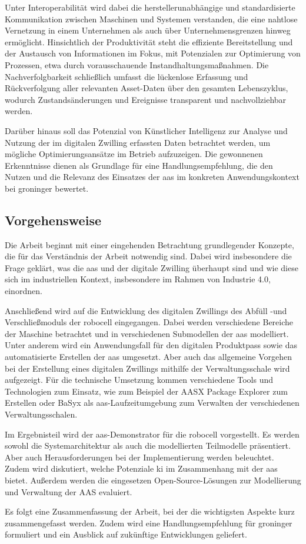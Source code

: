 Unter Interoperabilität wird dabei die herstellerunabhängige und standardisierte Kommunikation zwischen Maschinen und Systemen verstanden, die eine nahtlose Vernetzung in einem Unternehmen als auch über Unternehmensgrenzen hinweg ermöglicht.
Hinsichtlich der Produktivität steht die effiziente Bereitstellung und der Austausch von Informationen im Fokus, mit Potenzialen zur Optimierung von Prozessen, etwa durch vorausschauende Instandhaltungsmaßnahmen. 
Die Nachverfolgbarkeit schließlich umfasst die lückenlose Erfassung und Rückverfolgung aller relevanten Asset-Daten über den gesamten Lebenszyklus, wodurch Zustandsänderungen und Ereignisse transparent und nachvollziehbar werden.

Darüber hinaus soll das Potenzial von Künstlicher Intelligenz zur Analyse und Nutzung der im digitalen Zwilling erfassten Daten betrachtet werden, um mögliche Optimierungsansätze im Betrieb aufzuzeigen.
Die gewonnenen Erkenntnisse dienen als Grundlage für eine Handlungsempfehlung, die den Nutzen und die Relevanz des Einsatzes der \acs{aas} im konkreten Anwendungskontext bei groninger bewertet.

\subsection{Vorgehensweise}
Die Arbeit beginnt mit einer eingehenden Betrachtung grundlegender Konzepte, die für das Verständnis der Arbeit notwendig sind. 
Dabei wird insbesondere die Frage geklärt, was die \acs{aas} und der digitale Zwilling überhaupt sind und wie diese sich im industriellen Kontext, insbesondere im Rahmen von Industrie 4.0, einordnen.

Anschließend wird auf die Entwicklung des digitalen Zwillings des Abfüll -und Verschließmoduls der robocell eingegangen. 
Dabei werden verschiedene Bereiche der Maschine betrachtet und in verschiedenen Submodellen der \acs{aas} modelliert.
Unter anderem wird ein Anwendungsfall für den digitalen Produktpass sowie das automatisierte Erstellen der \acs{aas} umgesetzt.
Aber auch das allgemeine Vorgehen bei der Erstellung eines digitalen Zwillings mithilfe der Verwaltungsschale wird aufgezeigt.
Für die technische Umsetzung kommen verschiedene Tools und Technologien zum Einsatz, wie zum Beispiel der AASX Package Explorer zum Erstellen oder BaSyx als \acs{aas}-Laufzeitumgebung zum Verwalten der verschiedenen Verwaltungsschalen.

Im Ergebnisteil wird der \acs{aas}-Demonstrator für die robocell vorgestellt. Es werden sowohl die Systemarchitektur als auch die modellierten Teilmodelle präsentiert.
Aber auch Herausforderungen bei der Implementierung werden beleuchtet.
Zudem wird diskutiert, welche Potenziale \ac{ki} im Zusammenhang mit der \acs{aas} bietet.
Außerdem werden die eingesetzen Open-Source-Lösungen zur Modellierung und Verwaltung der AAS evaluiert.

Es folgt eine Zusammenfassung der Arbeit, bei der die wichtigsten Aspekte kurz zusammengefasst werden.
Zudem wird eine Handlungsempfehlung für groninger formuliert und ein Ausblick auf zukünftige Entwicklungen geliefert.